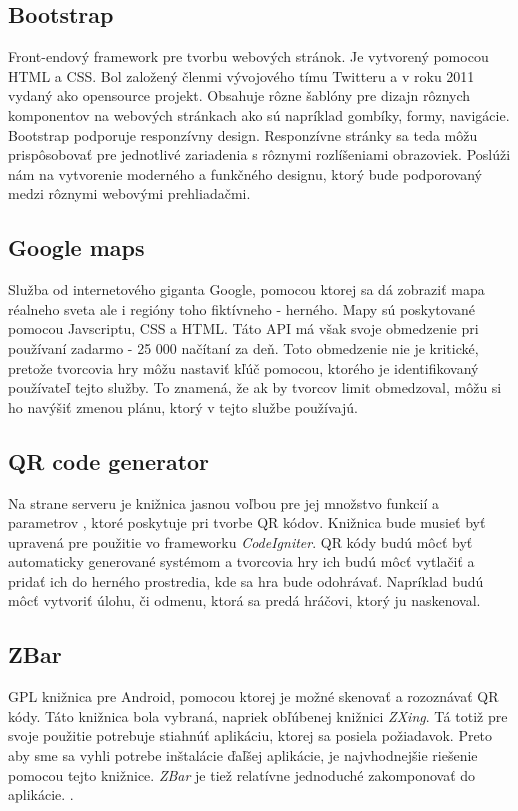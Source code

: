 \subsection{Bootstrap} Front-endový framework pre tvorbu webových stránok. Je vytvorený pomocou HTML a CSS. Bol založený členmi vývojového tímu Twitteru a v roku 2011 vydaný ako opensource projekt\cite{bootstrap-about}. Obsahuje rôzne šablóny pre dizajn rôznych komponentov na webových stránkach ako sú napríklad gombíky, formy, navigácie. Bootstrap podporuje responzívny design. Responzívne stránky sa teda môžu prispôsobovať pre jednotlivé zariadenia s rôznymi rozlíšeniami obrazoviek. Poslúži nám na vytvorenie moderného a funkčného designu, ktorý bude podporovaný medzi rôznymi webovými prehliadačmi.


\subsection{Google maps} Služba od internetového giganta Google, pomocou ktorej sa dá zobraziť mapa réalneho sveta ale i regióny toho fiktívneho - herného. Mapy sú poskytované pomocou Javscriptu, CSS a HTML. Táto API má však svoje obmedzenie pri používaní zadarmo - 25 000 načítaní za deň\cite{gmaps-usage}. Toto obmedzenie nie je kritické, pretože tvorcovia hry môžu nastaviť kľúč pomocou, ktorého je identifikovaný používateľ tejto služby. To znamená, že ak by tvorcov limit obmedzoval, môžu si ho navýšiť zmenou plánu, ktorý v tejto službe používajú. 

\subsection{QR code generator} Na strane serveru je knižnica jasnou voľbou pre jej množstvo funkcií a parametrov \cite{qrgenerator-functions}, ktoré poskytuje pri tvorbe QR kódov. Knižnica bude musieť byť upravená pre použitie vo frameworku \emph{CodeIgniter}. QR kódy budú môcť byť automaticky generované systémom a tvorcovia hry ich budú môcť vytlačiť a pridať ich do herného prostredia, kde sa hra bude odohrávať. Napríklad budú môcť vytvoriť úlohu, či odmenu, ktorá sa predá hráčovi, ktorý ju naskenoval.



\subsection{ZBar} GPL knižnica pre Android, pomocou ktorej je možné skenovať a rozoznávať QR kódy. Táto knižnica bola vybraná, napriek obľúbenej knižnici \emph{ZXing}. Tá totiž pre svoje použitie potrebuje stiahnúť aplikáciu, ktorej sa posiela požiadavok. Preto aby sme sa vyhli potrebe inštalácie ďaľšej aplikácie, je najvhodnejšie riešenie pomocou tejto knižnice. \emph{ZBar} je tiež relatívne jednoduché zakomponovať do aplikácie. \cite{qrreader}.


